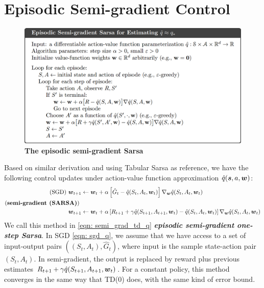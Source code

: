 \documentclass[11pt]{article}
\begin{document}
\section{Episodic Semi-gradient Control}
\begin{figure}
\begin{minipage}[t]{1\linewidth}
  \centering
  \centerline{\includegraphics[scale = 0.3]{semi_grad_sarsa.png}}
\end{minipage}
\caption{\footnotesize{\textbf{The episodic semi-gradient Sarsa}}}
\label{fig: semi_grad_sarsa}
\end{figure}
Based on similar derivation and using Tabular Sarsa as reference, we have the following control updates under action-value function approximation $\hat{q}(\boldsymbol{s}, a, \boldsymbol{w})$: 
\begin{align}
\text{(SGD) } \boldsymbol{w}_{t+1} &\leftarrow  \boldsymbol{w}_{t} + \alpha \left[\hat{G}_{t} - \hat{q}(S_{t}, A_{t}, \boldsymbol{w}_{t})\right]\nabla_{\boldsymbol{w}}{\hat{q}(S_{t}, A_{t}, \boldsymbol{w}_{t})} \label{eqn: sgd_q}\\
\text{(\textbf{semi-gradient (SARSA)}) }&\nonumber\\
\boldsymbol{w}_{t+1} &\leftarrow  \boldsymbol{w}_{t} + \alpha \left[R_{t+1} + \gamma \hat{q}(S_{t+1}, A_{t+1}, \boldsymbol{w}_{t}) - \hat{q}(S_{t}, A_{t}, \boldsymbol{w}_{t})\right] \nabla_{\boldsymbol{w}}{\hat{q}(S_{t}, A_{t}, \boldsymbol{w}_{t})}  \label{eqn: semi_grad_td_q}
\end{align} We call this method in  \eqref{eqn: semi_grad_td_q} \emph{\textbf{episodic semi-gradient one-step Sarsa}}. In SGD \eqref{eqn: sgd_q}, we assume that we have access to a set of input-output pairs $((S_{t}, A_{t}), \hat{G}_{t})$, where input is the sample state-action pair $(S_{t}, A_{t})$. In semi-gradient, the output is replaced by reward plus previous estimates $R_{t+1} + \gamma \hat{q}(S_{t+1}, A_{t+1}, \boldsymbol{w}_{t})$.  For a constant policy, this method converges in the same way that TD(0) does, with the same kind of error bound.
\end{document}
